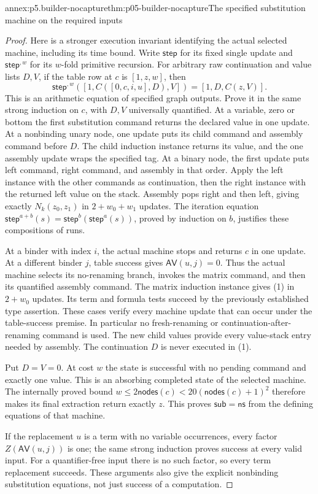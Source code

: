 \begin{annexitem}{annex:p5.builder-nocapture}{thm:p05-builder-nocapture}{The specified substitution machine on the required inputs}
\begin{proof}
Here is a stronger execution invariant identifying the actual selected
machine, including its time bound. Write \(\mathsf{step}\) for its fixed
single update and \(\mathsf{step}^{,w}\) for its \(w\)-fold primitive
recursion. For arbitrary raw continuation and value lists \(D,V\), if
the table row at \(c\) is \([1,z,w]\), then
\[
 \mathsf{step}^{,w}([1,C([0,c,i,u],D),V])=[1,D,C(z,V)].
\tag{1}
\]
This is an arithmetic equation of specified graph outputs. Prove it in the
same strong induction on \(c\), with \(D,V\) universally quantified.
At a variable, zero or bottom the first substitution command returns the
declared value in one update. At a nonbinding unary node, one update puts
its child command and assembly command before \(D\). The child induction
instance returns its value, and the one assembly update wraps the specified
tag. At a binary node, the first update puts left command, right command,
and assembly in that order. Apply the left instance with the other commands
as continuation, then the right instance with the returned left value on
the stack. Assembly pops right and then left, giving exactly
\(N_k(z_0,z_1)\) in \(2+w_0+w_1\) updates. The iteration equation
\(\mathsf{step}^{a+b}(s)=\mathsf{step}^{b}(\mathsf{step}^{a}(s))\),
proved by induction on \(b\), justifies these compositions of runs.

At a binder with index \(i\), the actual machine stops and returns \(c\)
in one update. At a different binder \(j\), table success gives
\(\mathsf{AV}(u,j)=0\). Thus the actual machine selects its no-renaming
branch, invokes the matrix command, and then its quantified assembly command.
The matrix induction instance gives (1) in \(2+w_0\) updates. Its term and
formula tests succeed by the previously established type assertion. These
cases verify every machine update that can occur under the table-success
premise. In particular no fresh-renaming or continuation-after-renaming
command is used. The new child values provide every value-stack entry needed
by assembly. The continuation \(D\) is never executed in (1).

Put \(D=V=0\). At cost \(w\) the state is successful with no pending
command and exactly one value. This is an absorbing completed state of the
selected machine. The internally proved bound
\(w\leq2\mathsf{nodes}(c)<20(\mathsf{nodes}(c)+1)^2\) therefore makes
its final extraction return exactly \(z\). This proves
\(\mathsf{sub}=\mathsf{ns}\) from the defining equations of that machine.

If the replacement \(u\) is a term with no variable occurrences, every factor
\(Z(\mathsf{AV}(u,j))\) is one; the same strong induction proves success
at every valid input. For a quantifier-free input there is no such factor,
so every term replacement succeeds. These arguments also give the explicit
nonbinding substitution equations, not just success of a computation.


\end{proof}
\end{annexitem}
